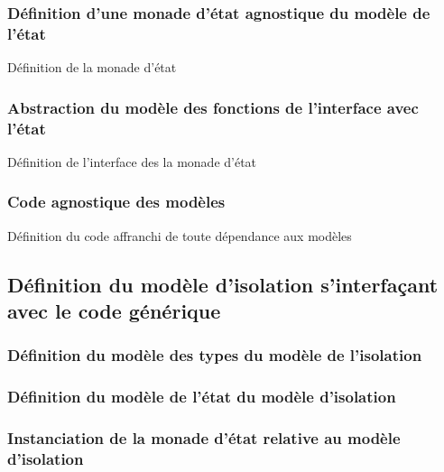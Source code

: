 			\subsubsection{Définition d'une monade d'état agnostique du modèle de l'état}

			\begin{listing}[!ht]
				\caption{Définition de la monade d'état}
				\label{code:StateAgnosticMonad}
			\end{listing}

			\subsubsection{Abstraction du modèle des fonctions de l'interface avec l'état}

			\begin{listing}[!ht]
				\caption{Définition de l'interface des la monade d'état}
				\label{code:InterfaceParameters}
			\end{listing}

			\subsubsection{Code agnostique des modèles}

			\begin{listing}[!ht]
				\caption{Définition du code affranchi de toute dépendance aux modèles}
				\label{code:ModelAgnosticCode}
			\end{listing}

		\subsection{Définition du modèle d'isolation s'interfaçant avec le code générique}
			\subsubsection{Définition du modèle des types du modèle de l'isolation}

			\subsubsection{Définition du modèle de l'état du modèle d'isolation}

			\subsubsection{Instanciation de la monade d'état relative au modèle d'isolation}

